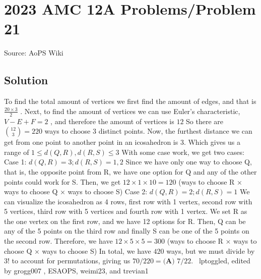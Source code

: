 \documentclass[12pt]{article}
\begin{document}
\section*{{2023 AMC 12A Problems/Problem 21}}
Source: AoPS Wiki

\subsection*{Solution}
To find the total amount of vertices we first find the amount of edges, and that is $\frac{20 \times 3}{2}$ . Next, to find the amount of vertices we can use Euler's characteristic, $V - E + F = 2$ , and therefore the amount of vertices is $12$ So there are $\binom{12}{3} = 220$ ways to choose 3 distinct points. Now, the furthest distance we can get from one point to another point in an icosahedron is 3. Which gives us a range of $1 \leq d(Q, R), d(R, S) \leq 3$ With some case work, we get two cases: Case 1: $d(Q, R) = 3; d(R, S) = 1, 2$ Since we have only one way to choose Q, that is, the opposite point from R, we have one option for Q and any of the other points could work for S. Then, we get $12 \times 1 \times 10 = 120$ (ways to choose R × ways to choose Q × ways to choose S) Case 2: $d(Q, R) = 2; d(R, S) = 1$ We can visualize the icosahedron as 4 rows, first row with 1 vertex, second row with 5 vertices, third row with 5 vertices and fourth row with 1 vertex. We set R as the one vertex on the first row, and we have 12 options for R. Then, Q can be any of the 5 points on the third row and finally S can be one of the 5 points on the second row. Therefore, we have $12 \times 5 \times 5 = 300$ (ways to choose R × ways to choose Q × ways to choose S) In total, we have $420$ ways, but we must divide by $3!$ to account for permutations, giving us $70/220 = \boxed{\textbf{(A) } 7/22}.$ ~lptoggled, edited by grogg007 , ESAOPS, weimi23, and trevian1
\end{document}
